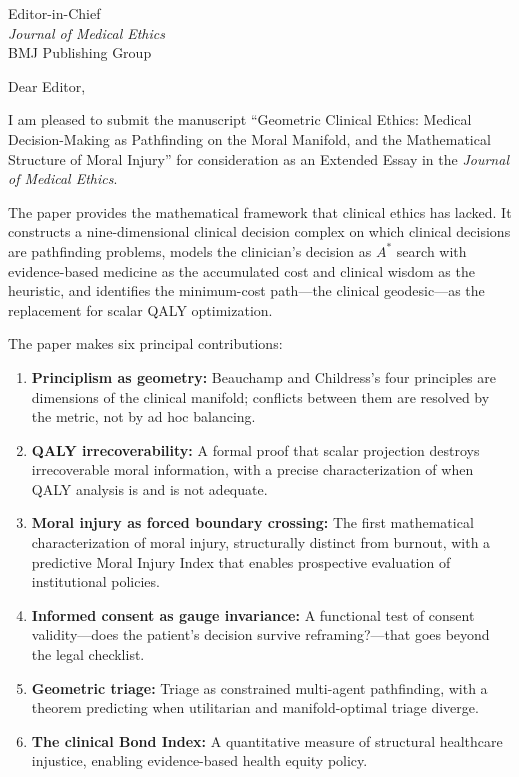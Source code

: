 \documentclass[12pt]{letter}
\begin{document}
\begin{letter}{%
Editor-in-Chief\\
\emph{Journal of Medical Ethics}\\
BMJ Publishing Group}

\opening{Dear Editor,}

I am pleased to submit the manuscript ``Geometric Clinical Ethics: Medical Decision-Making as Pathfinding on the Moral Manifold, and the Mathematical Structure of Moral Injury'' for consideration as an Extended Essay in the \emph{Journal of Medical Ethics}.

The paper provides the mathematical framework that clinical ethics has lacked.  It constructs a nine-dimensional clinical decision complex on which clinical decisions are pathfinding problems, models the clinician's decision as $A^*$ search with evidence-based medicine as the accumulated cost and clinical wisdom as the heuristic, and identifies the minimum-cost path---the clinical geodesic---as the replacement for scalar QALY optimization.

The paper makes six principal contributions:
\begin{enumerate}
    \item \textbf{Principlism as geometry:} Beauchamp and Childress's four principles are dimensions of the clinical manifold; conflicts between them are resolved by the metric, not by ad hoc balancing.
    \item \textbf{QALY irrecoverability:} A formal proof that scalar projection destroys irrecoverable moral information, with a precise characterization of when QALY analysis is and is not adequate.
    \item \textbf{Moral injury as forced boundary crossing:} The first mathematical characterization of moral injury, structurally distinct from burnout, with a predictive Moral Injury Index that enables prospective evaluation of institutional policies.
    \item \textbf{Informed consent as gauge invariance:} A functional test of consent validity---does the patient's decision survive reframing?---that goes beyond the legal checklist.
    \item \textbf{Geometric triage:} Triage as constrained multi-agent pathfinding, with a theorem predicting when utilitarian and manifold-optimal triage diverge.
    \item \textbf{The clinical Bond Index:} A quantitative measure of structural healthcare injustice, enabling evidence-based health equity policy.
\end{enumerate}


\end{letter}
\end{document}
